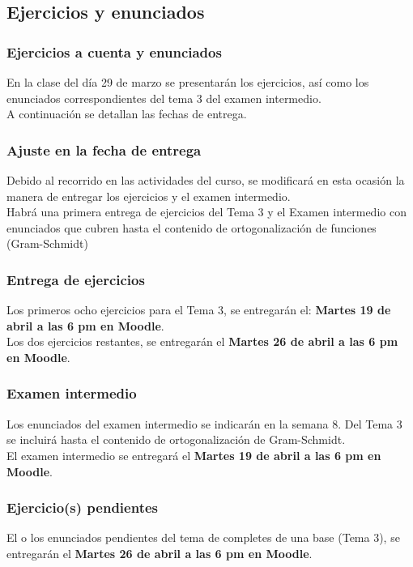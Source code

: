 \documentclass[12pt]{beamer}
\begin{document}
\subsection{Ejercicios y enunciados}

\begin{frame}
\frametitle{Ejercicios a cuenta y enunciados}
En la clase del día 29 de marzo se presentarán los ejercicios, así como los enunciados correspondientes del tema 3 del examen intermedio.
\\
\bigskip
A continuación se detallan las fechas de entrega.
\end{frame}
\begin{frame}
\frametitle{Ajuste en la fecha de entrega}
Debido al recorrido en las actividades del curso, se modificará en esta ocasión la manera de entregar los ejercicios y el examen intermedio.
\\
\bigskip
\pause
Habrá  una primera entrega de ejercicios del Tema 3 y el Examen intermedio con enunciados que cubren hasta el contenido de ortogonalización de funciones (Gram-Schmidt)
\end{frame}
\begin{frame}
\frametitle{Entrega de ejercicios}
Los primeros ocho ejercicios para el Tema 3, se entregarán el: \pause \textbf{Martes 19 de abril a las 6 pm en Moodle}.
\\
\bigskip
\pause
Los dos ejercicios restantes, se entregarán el \pause \textbf{Martes 26 de abril a las 6 pm en Moodle}.
\end{frame}
\begin{frame}
\frametitle{Examen intermedio}
Los enunciados del  examen intermedio se indicarán en la semana 8. \pause Del Tema 3 se incluirá hasta el contenido de ortogonalización de Gram-Schmidt.
\\
\bigskip
\pause
El examen intermedio se entregará el \textbf{Martes 19 de abril a las 6 pm en Moodle}.
\end{frame}
\begin{frame}
\frametitle{Ejercicio(s) pendientes} 
El o los enunciados pendientes del tema de completes de una base (Tema 3), se entregarán el \pause \textbf{Martes 26 de abril a las 6 pm en Moodle}.
\end{frame}

\end{document}
